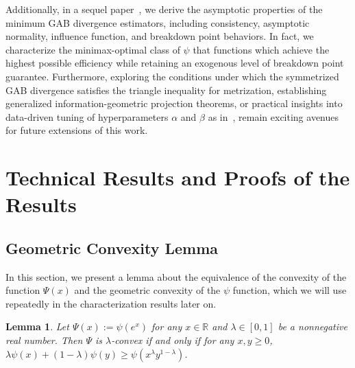 \documentclass[11pt]{article}
\theoremstyle{plain}
\newtheorem{lemma}[theorem]{Lemma}
\theoremstyle{remark}
\def\R{\mathbb{R}}
\begin{document}
Additionally, in a sequel paper~\citep{roy2026gaboptimal}, we derive the asymptotic properties of the minimum GAB divergence estimators, including consistency, asymptotic normality, influence function, and breakdown point behaviors. In fact, we characterize the minimax-optimal class of $\psi$ that functions which achieve the highest possible efficiency while retaining an exogenous level of breakdown point guarantee. Furthermore, exploring the conditions under which the symmetrized GAB divergence satisfies the triangle inequality for metrization, establishing generalized information-geometric projection theorems, or practical insights into data-driven tuning of hyperparameters $\alpha$ and $\beta$ as in~\cite{basak2021optimal}, remain exciting avenues for future extensions of this work.




\pagebreak
\appendix

\section{Technical Results and Proofs of the Results}\label{appendix:proofs}

\subsection{Geometric Convexity Lemma}\label{appendix:geom-convex-lemma}

In this section, we present a lemma about the equivalence of the convexity of the function $\Psi(x)$ and the geometric convexity of the $\psi$ function, which we will use repeatedly in the characterization results later on.

\begin{lemma}\label{lem:geometric-convexity}
    Let $\Psi(x) := \psi(e^x)$ for any $x \in \R$ and $\lambda \in [0, 1]$ be a nonnegative real number. Then $\Psi$ is $\lambda$-convex if and only if for any $x, y \geq 0$, $\lambda \psi(x) + (1 - \lambda) \psi(y) \geq \psi(x^\lambda y^{1-\lambda})$.
\end{lemma}
\end{document}
